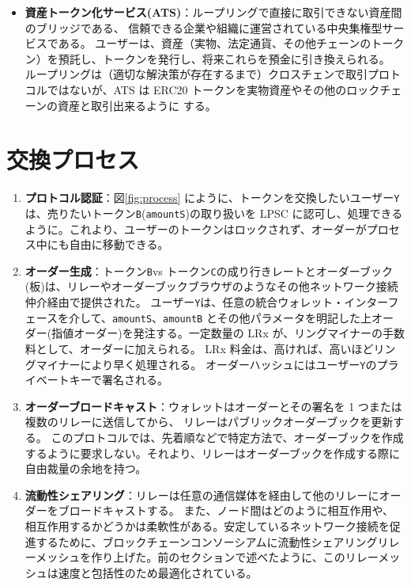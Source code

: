 \documentclass{article}
\begin{document}
\begin{multicols}{2}
\begin{itemize}
\item \textbf{資産トークン化サービス(ATS)}：ループリングで直接に取引できない資産間のブリッジである、 信頼できる企業や組織に運営されている中央集権型サービスである。 ユーザーは、資産（実物、法定通貨、その他チェーンのトークン）を預託し、トークンを発行し、将来これらを預金に引き換えられる。 ループリングは（適切な解決策が存在するまで）クロスチェンで取引プロトコルではないが、ATS は ERC20 トークンを実物資産やその他のロックチェーンの資産と取引出来るように \cite{ERC20} する。

\end{itemize}

\section{交換プロセス\label{sec:process}}

\begin{enumerate} 

\item \textbf{プロトコル認証}：図\ref{fig:process} にように、トークンを交換したいユーザー\verb|Y|は、売りたいトークン\verb|B|(\verb|amountS|)の取り扱いを LPSC に認可し、処理できるように。これより、ユーザーのトークンはロックされず、オーダーがプロセス中にも自由に移動できる。

\item \textbf{オーダー生成}：トークン\verb|B|vs トークン\verb|C|の成り行きレートとオーダーブック(板)は、リレーやオーダーブックブラウザのようなその他ネットワーク接続仲介経由で提供された。 ユーザー\verb|Y|は、任意の統合ウォレット・インターフェースを介して、\verb|amountS|、\verb|amountB| とその他パラメータを明記した上オーダー(指値オーダー)を発注する。一定数量の LRx が、リングマイナーの手数料として、オーダーに加えられる。 LRx 料金は、高ければ、高いほどリングマイナーにより早く処理される。 オーダーハッシュにはユーザー\verb|Y|のプライベートキーで署名される。

\item \textbf{オーダーブロードキャスト}：ウォレットはオーダーとその署名を 1 つまたは複数のリレーに送信してから、 リレーはパブリックオーダーブックを更新する。 このプロトコルでは、先着順などで特定方法で、オーダーブックを作成するように要求しない。それより、リレーはオーダーブックを作成する際に自由裁量の余地を持つ。

\item \textbf{流動性シェアリング}：リレーは任意の通信媒体を経由して他のリレーにオーダーをブロードキャストする。 また、ノード間はどのように相互作用や、相互作用するかどうかは柔軟性がある。安定しているネットワーク接続を促進するために、ブロックチェーンコンソーシアムに流動性シェアリングリレーメッシュを作り上げた。前のセクションで述べたように、このリレーメッシュは速度と包括性のため最適化されている。


\end{enumerate}
\end{multicols}
\end{document}
